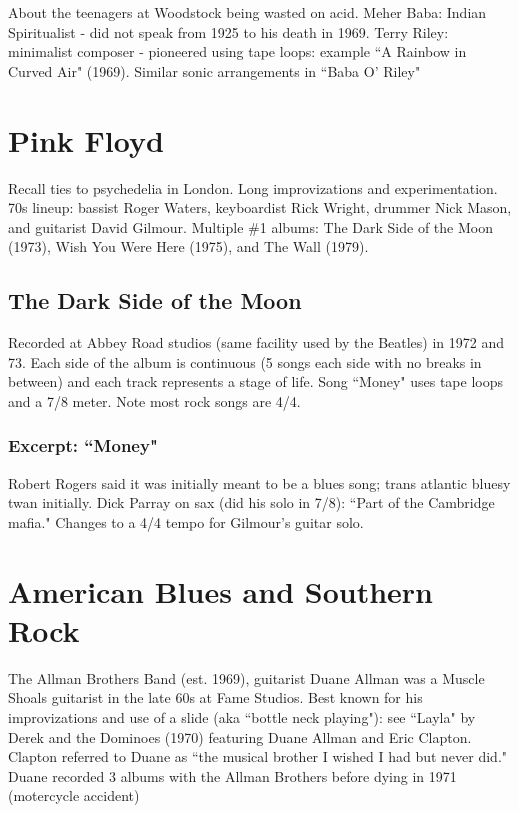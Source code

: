 \documentclass[12pt, a4paper, twoside, openright, titlepage]{book}
\begin{document}
About the teenagers at Woodstock being wasted on acid. Meher Baba: Indian Spiritualist - did not speak from 1925 to his death in 1969. Terry Riley: minimalist composer - pioneered using tape loops: example ``A Rainbow in Curved Air" (1969). Similar sonic arrangements in ``Baba O' Riley"


\section{Pink Floyd}

Recall ties to psychedelia in London. Long improvizations and experimentation. 70s lineup: bassist Roger Waters, keyboardist Rick Wright, drummer Nick Mason, and guitarist David Gilmour. Multiple \#1 albums: The Dark Side of the Moon (1973), Wish You Were Here (1975), and The Wall (1979).


\subsection{The Dark Side of the Moon}

Recorded at Abbey Road studios (same facility used by the Beatles) in 1972 and 73. Each side of the album is continuous (5 songs each side with no breaks in between) and each track represents a stage of life. Song ``Money" uses tape loops and a 7/8 meter. Note most rock songs are 4/4. 

\subsubsection{Excerpt: ``Money"}

Robert Rogers said it was initially meant to be a blues song; trans atlantic bluesy twan initially. Dick Parray on sax (did his solo in 7/8): ``Part of the Cambridge mafia." Changes to a 4/4 tempo for Gilmour's guitar solo.

\section{American Blues and Southern Rock}


The Allman Brothers Band (est. 1969), guitarist Duane Allman was a Muscle Shoals guitarist in the late 60s at Fame Studios. Best known for his improvizations and use of a slide (aka ``bottle neck playing"): see ``Layla" by Derek and the Dominoes (1970) featuring Duane Allman and Eric Clapton. Clapton referred to Duane as ``the musical brother I wished I had but never did." Duane recorded 3 albums with the Allman Brothers before dying in 1971 (motercycle accident)
\end{document}
